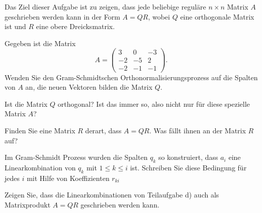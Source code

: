 %
%
%
%
%
%
Das Ziel dieser Aufgabe ist zu zeigen, dass jede beliebige reguläre 
$n\times n$ Matrix $A$ geschrieben werden kann in der Form $A=QR$,
wobei $Q$ eine orthogonale Matrix ist und $R$ eine obere Dreicksmatrix.
\begin{teilaufgaben}
\item
Gegeben ist die Matrix 
\[
A=\begin{pmatrix}
 3& 0&-3\\
-2&-5& 2\\
-2&-1&-1
\end{pmatrix}.
\]
Wenden Sie den Gram-Schmidtschen Orthonormalisierungsprozess auf
die Spalten von $A$ an, die neuen Vektoren bilden die Matrix $Q$.
\item
Ist die Matrix $Q$ orthogonal?
Ist das immer so, also nicht nur für diese spezielle Matrix $A$?
\item
Finden Sie eine Matrix $R$ derart, dass $A=QR$.
Was fällt ihnen an der Matrix $R$ auf?
\item 
Im Gram-Schmidt Prozess wurden die Spalten $q_k$ so konstruiert, dass
$a_i$ eine Linearkombination von $q_k$ mit $1\le k\le i$ ist.
Schreiben Sie diese Bedingung für jedes $i$ mit Hilfe von Koeffizienten
$r_{ki}$
\item
Zeigen Sie, dass die Linearkombinationen von Teilaufgabe d) auch
als Matrixprodukt $A=QR$
geschrieben werden kann.
\end{teilaufgaben}


\begin{loesung}
\begin{teilaufgaben}
\item
\item
\item
\item
\item
\end{teilaufgaben}
\end{loesung}

